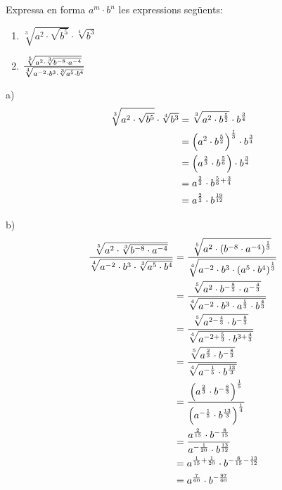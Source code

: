\begin{exercici}
Expressa en forma $a^{m}\cdot b^{n}$ les expressions següents:

\begin{enumerate}
\item[a)] $\sqrt[3]{a^{2}\cdot \sqrt{b^{5}}}\cdot \sqrt[4]{b^{3}}$

\item[b)] $\frac{\sqrt[5]{a^{2}\cdot \sqrt[3]{b^{-8}\cdot a^{-4}}}}{\sqrt[4]{%
a^{-2}\cdot b^{3}\cdot \sqrt[3]{a^{5}\cdot b^{4}}}}$
\end{enumerate}

\end{exercici}

\begin{solucio}
a)%
\begin{align*}
\sqrt[3]{a^{2}\cdot \sqrt{b^{5}}}\cdot \sqrt[4]{b^{3}} &=\sqrt[3]{%
a^{2}\cdot b^{\frac{5}{2}}}\cdot b^{\frac{3}{4}} \\
&=\left( a^{2}\cdot b^{\frac{5}{2}}\right) ^{\frac{1}{3}}\cdot b^{\frac{3}{4%
}} \\
&=\left( a^{\frac{2}{3}}\cdot b^{\frac{5}{6}}\right) \cdot b^{\frac{3}{4}}
\\
&=a^{\frac{2}{3}}\cdot b^{\frac{5}{6}+\frac{3}{4}} \\
&=a^{\frac{2}{3}}\cdot b^{\frac{19}{12}}
\end{align*}

b)%
\begin{align*}
\frac{\sqrt[5]{a^{2}\cdot \sqrt[3]{b^{-8}\cdot a^{-4}}}}{\sqrt[4]{%
a^{-2}\cdot b^{3}\cdot \sqrt[3]{a^{5}\cdot b^{4}}}} &=\frac{\sqrt[5]{%
a^{2}\cdot \left( b^{-8}\cdot a^{-4}\right) ^{\frac{1}{3}}}}{\sqrt[4]{%
a^{-2}\cdot b^{3}\cdot \left( a^{5}\cdot b^{4}\right) ^{\frac{1}{3}}}} \\
&=\frac{\sqrt[5]{a^{2}\cdot b^{-\frac{8}{3}}\cdot a^{-\frac{4}{3}}}}{\sqrt[4%
]{a^{-2}\cdot b^{3}\cdot a^{\frac{5}{3}}\cdot b^{\frac{4}{3}}}} \\
&=\frac{\sqrt[5]{a^{2-\frac{4}{3}}\cdot b^{-\frac{8}{3}}}}{\sqrt[4]{a^{-2+%
\frac{5}{3}}\cdot b^{3+\frac{4}{3}}}} \\
&=\frac{\sqrt[5]{a^{\frac{2}{3}}\cdot b^{-\frac{8}{3}}}}{\sqrt[4]{a^{-\frac{%
1}{5}}\cdot b^{\frac{13}{3}}}} \\
&=\frac{\left( a^{\frac{2}{3}}\cdot b^{-\frac{8}{3}}\right) ^{\frac{1}{5}}}{%
\left( a^{-\frac{1}{5}}\cdot b^{\frac{13}{3}}\right) ^{\frac{1}{4}}} \\
&=\frac{a^{\frac{2}{15}}\cdot b^{-\frac{8}{15}}}{a^{-\frac{1}{20}}\cdot b^{%
\frac{13}{12}}} \\
&=a^{\frac{1}{15}+\frac{1}{20}}\cdot b^{-\frac{8}{15}-\frac{13}{12}} \\
&=a^{\frac{7}{60}}\cdot b^{-\frac{97}{60}}
\end{align*}
\end{solucio}

